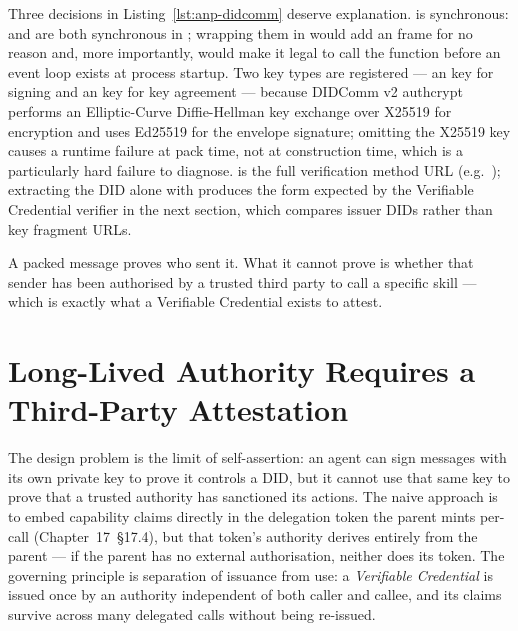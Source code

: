 Three decisions in Listing~\ref{lst:anp-didcomm} deserve explanation.
 is synchronous:  and
 are both synchronous in
; wrapping them in  would add an
 frame for no reason and, more importantly, would make it
legal to call the function before an event loop exists at process startup.
Two key types are registered --- an  key for signing and an
 key for key agreement --- because DIDComm v2 authcrypt
performs an Elliptic-Curve Diffie-Hellman key exchange over X25519 for
encryption and uses Ed25519 for the envelope signature; omitting the
X25519 key causes a runtime failure at pack time, not at construction time,
which is a particularly hard failure to diagnose. 
is the full verification method URL (e.g.\
); extracting the DID alone with
\code{split("\#")[0]} produces the form expected by the Verifiable
Credential verifier in the next section, which compares issuer DIDs rather
than key fragment URLs.

A packed message proves who sent it. What it cannot prove is whether that
sender has been authorised by a trusted third party to call a specific
skill --- which is exactly what a Verifiable Credential exists to attest.


\section{Long-Lived Authority Requires a Third-Party Attestation}
\label{sec:anp-vc}

The design problem is the limit of self-assertion: an agent can sign
messages with its own private key to prove it controls a DID, but it
cannot use that same key to prove that a trusted authority has sanctioned
its actions. The naive approach is to embed capability claims directly in
the delegation token the parent mints per-call (Chapter~17~\S17.4), but
that token's authority derives entirely from the parent --- if the parent
has no external authorisation, neither does its token. The governing
principle is separation of issuance from use: a \emph{Verifiable
Credential} is issued once by an authority independent of both caller and
callee, and its claims survive across many delegated calls without being
re-issued.

